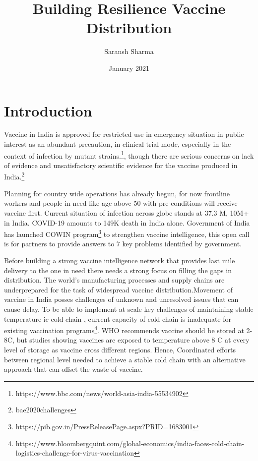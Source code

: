 \documentclass{article}
\begin{document}
\title{Building Resilience Vaccine Distribution}
\author{Saransh Sharma }
\date{January 2021}


\maketitle

\section{Introduction}

Vaccine in India is approved for restricted use in emergency situation in public interest as an abundant precaution, in clinical trial mode, especially in the context of infection by mutant strains.\footnote{https://www.bbc.com/news/world-asia-india-55534902}, though there are serious concerns on lack of evidence and unsatisfactory scientific evidence for the vaccine produced in India.\footnote{bae2020challenges}

Planning for country wide operations has already begun, for now frontline workers and people in need like age above 50 with pre-conditions will receive vaccine first. Current situation of infection across globe stands at 37.3 M, 10M+ in India. COVID-19 amounts to 149K death in India alone.
Government of India has launched COWIN program\footnote{https://pib.gov.in/PressReleasePage.aspx?PRID=1683001} to strengthen vaccine intelligence, this open call is for partners to provide answers to 7 key problems identified by government.

Before building a strong vaccine intelligence network that provides last mile delivery to the one in need there needs a strong focus on filling the gaps in distribution. The world’s manufacturing processes and supply chains are underprepared for the task of widespread vaccine distribution\cite{bae2020challenges}.Movement of vaccine in India posses challenges of unknown and unresolved issues that can cause delay. To be able to implement at scale key challenges of maintaining stable temperature ie cold chain , current capacity of cold chain is inadequate for existing vaccination programs\footnote{https://www.bloombergquint.com/global-economics/india-faces-cold-chain-logistics-challenge-for-virus-vaccination}. WHO recommends vaccine should be stored at 2-8\degree C, but studies showing vaccines are exposed to temperature above 8 \degree C\cite{dhere2011pandemic} at every level of storage as vaccine cross different regions. Hence, Coordinated efforts between regional level needed to achieve a stable cold chain with an alternative approach that can offset the waste of vaccine.
\end{document}
